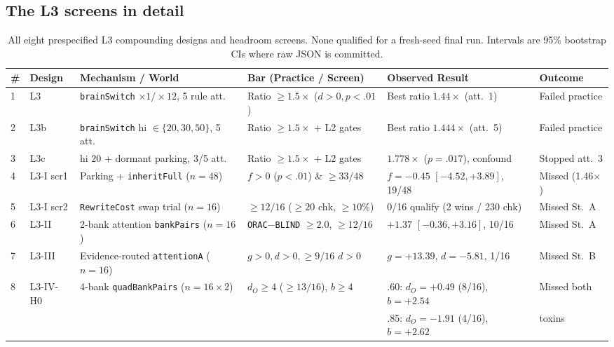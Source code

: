\subsection{The L3 screens in detail}

\label{app:l3}

\begin{table}[t]
\centering
\caption{All eight prespecified L3 compounding designs and headroom screens. None qualified for a fresh-seed final run. Intervals are 95\% bootstrap CIs where raw JSON is committed.}
\label{tab:l3-screens}
\small
\begin{adjustbox}{max width=\textwidth}
\begin{tabular}{@{}llllll@{}}
\toprule
\textbf{\#} & \textbf{Design} & \textbf{Mechanism / World} & \textbf{Bar (Practice / Screen)} & \textbf{Observed Result} & \textbf{Outcome} \\
\midrule
1 & L3 & \texttt{brainSwitch} $\times 1/\times 12$, 5 rule att. & Ratio $\ge 1.5\times$ ($d>0, p<.01$) & Best ratio $1.44\times$ (att.\ 1) & Failed practice \\
2 & L3b & \texttt{brainSwitch} hi $\in\{20,30,50\}$, 5 att. & Ratio $\ge 1.5\times$ + L2 gates & Best ratio $1.444\times$ (att.\ 5) & Failed practice \\
3 & L3c & hi $20$ + dormant parking, 3/5 att. & Ratio $\ge 1.5\times$ + L2 gates & $1.778\times$ ($p=.017$), confound & Stopped att.\ 3 \\
4 & L3-I scr1 & Parking + \texttt{inheritFull} ($n=48$) & $f>0$ ($p<.01$) \& $\ge 33/48$ & $f=-0.45$ $[-4.52,+3.89]$, 19/48 & Missed (1.46$\times$) \\
5 & L3-I scr2 & \texttt{RewriteCost} swap trial ($n=16$) & $\ge 12/16$ ($\ge 20$ chk, $\ge 10\%$) & 0/16 qualify (2 wins / 230 chk) & Missed St.\ A \\
6 & L3-II & 2-bank attention \texttt{bankPairs} ($n=16$) & \texttt{ORAC}$-$\texttt{BLIND} $\ge 2.0$, $\ge 12/16$ & $+1.37$ $[-0.36,+3.16]$, 10/16 & Missed St.\ A \\
7 & L3-III & Evidence-routed \texttt{attentionA} ($n=16$) & $g>0, d>0, \ge 9/16$ $d>0$ & $g=+13.39$, $d=-5.81$, 1/16 & Missed St.\ B \\
8 & L3-IV-H0 & 4-bank \texttt{quadBankPairs} ($n=16\times 2$) & $d_O\ge 4$ ($\ge 13/16$), $b\ge 4$ & .60: $d_O=+0.49$ (8/16), $b=+2.54$ & Missed both \\
  &          &                                          &                                & .85: $d_O=-1.91$ (4/16), $b=+2.62$ & toxins \\
\bottomrule
\end{tabular}
\end{adjustbox}
\end{table}

